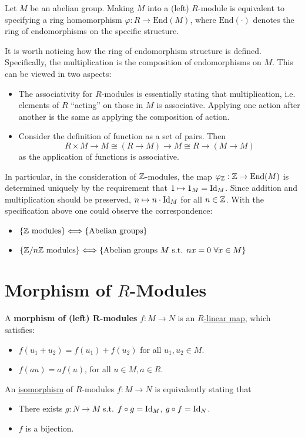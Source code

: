 \documentclass{article}
\begin{document}
\begin{remark}
    Let $M$ be an abelian group. Making $M$ into a (left) $R$-module is equivalent to specifying a ring homomorphism $\varphi: R\to \mathrm{End}(M)$, where $\mathrm{End}(\cdot)$ denotes the ring of endomorphisms on the specific structure. 
    
    It is worth noticing how the ring of endomorphism structure is defined. Specifically, the multiplication is the composition of endomorphisms on $M$. This can be viewed in two aspects:
    \begin{itemize}
        \item The associativity for $R$-modules is essentially stating that multiplication, i.e. elements of $R$ ``acting'' on those in $M$ is associative. Applying one action after another is the same as applying the composition of action.  
        \item Consider the definition of function as a set of pairs. Then
        \[
            R\times M \to M \cong (R\to M) \to M \cong R\to(M\to M)
        \]
        as the application of functions is associative. 
    \end{itemize}

    In particular, in the consideration of $\mathbb{Z}$-modules, the map $\varphi_{\mathbb{Z}}: \mathbb{Z} \to \mathrm{End}(M)$ is determined uniquely by the requirement that $1\mapsto 1_M = \mathrm{Id}_M$. Since addition and multiplication should be preserved, $n\mapsto n\cdot \mathrm{Id}_{M}$ for all $n\in \mathbb{Z}$. With the specification above one could observe the correspondence:
    \begin{itemize}
        \item $\{\mathbb{Z} \text{ modules}\} \Longleftrightarrow \{ \text{Abelian groups} \}$
        \item  $\{\Z/n\Z \text{ modules}\} \Longleftrightarrow \{ \text{Abelian groups } M \text{ s.t. } nx = 0\ \forall x\in M \}$
    \end{itemize}
\end{remark}

\section{Morphism of $R$-Modules}

\begin{definition}
    A \textbf{morphism of (left) $\bm{R}$-modules} $f: M\to N$ is an \underline{$R$-linear map}, which satisfies:
    \begin{itemize}
        \item $f(u_1 + u_2) = f(u_1) + f(u_2)$ for all $u_1, u_2\in M$.
        \item $f(au) = af(u)$, for all $u \in M, a\in R$.
    \end{itemize} 

    An \underline{isomorphism} of $R$-modules $f: M\to N$ is equivalently stating that
    \begin{itemize}
        \item There exists $g: N\to M$ s.t. $f\circ g = \mathrm{Id}_{M}$, $g\circ f = \mathrm{Id}_{N}$.
        \item $f$ is a bijection.
    \end{itemize}
\end{definition}
\end{document}
